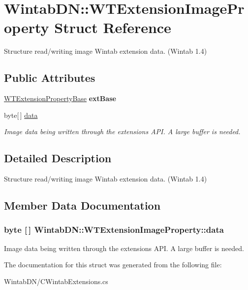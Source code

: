 \hypertarget{struct_wintab_d_n_1_1_w_t_extension_image_property}{
\section{WintabDN::WTExtensionImageProperty Struct Reference}
\label{struct_wintab_d_n_1_1_w_t_extension_image_property}
}


Structure read/writing image Wintab extension data. (Wintab 1.4)  


\subsection*{Public Attributes}
\begin{DoxyCompactItemize}
\item 
\hypertarget{struct_wintab_d_n_1_1_w_t_extension_image_property_afbf79206281073fe55b19cd6e503f58a}{
\hyperlink{struct_wintab_d_n_1_1_w_t_extension_property_base}{WTExtensionPropertyBase} {\bfseries extBase}}
\label{struct_wintab_d_n_1_1_w_t_extension_image_property_afbf79206281073fe55b19cd6e503f58a}

\item 
byte\mbox{[}$\,$\mbox{]} \hyperlink{struct_wintab_d_n_1_1_w_t_extension_image_property_a691312d6e6b89ad18b127a61e5ba15b9}{data}
\begin{DoxyCompactList}\small\item\em Image data being written through the extensions API. A large buffer is needed. \item\end{DoxyCompactList}\end{DoxyCompactItemize}


\subsection{Detailed Description}
Structure read/writing image Wintab extension data. (Wintab 1.4) 

\subsection{Member Data Documentation}
\hypertarget{struct_wintab_d_n_1_1_w_t_extension_image_property_a691312d6e6b89ad18b127a61e5ba15b9}{
\subsubsection[{data}]{\setlength{\rightskip}{0pt plus 5cm}byte \mbox{[}$\,$\mbox{]} {\bf WintabDN::WTExtensionImageProperty::data}}}
\label{struct_wintab_d_n_1_1_w_t_extension_image_property_a691312d6e6b89ad18b127a61e5ba15b9}


Image data being written through the extensions API. A large buffer is needed. 



The documentation for this struct was generated from the following file:\begin{DoxyCompactItemize}
\item 
WintabDN/CWintabExtensions.cs\end{DoxyCompactItemize}
